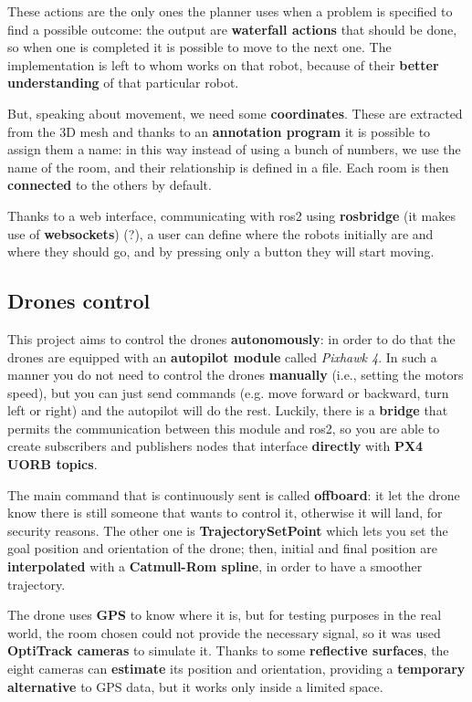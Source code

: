 \bigskip

These actions are the only ones the planner uses when a problem is specified to find a possible outcome: the output are \textbf{waterfall actions} that should be done, so when one is completed it is possible to move to the next one. The implementation is left to whom works on that robot, because of their \textbf{better understanding} of that particular robot.

But, speaking about movement, we need some \textbf{coordinates}. These are extracted from the 3D mesh and thanks to an \textbf{annotation program} it is possible to assign them a name: in this way instead of using a bunch of numbers, we use the name of the room, and their relationship is defined in a file. Each room is then \textbf{connected} to the others by default.

Thanks to a web interface, communicating with \acrshort{ros}2 using \textbf{rosbridge} (it makes use of \textbf{websockets}) (?), a user can define where the robots initially are and where they should go, and by pressing only a button they will start moving.   

\subsection{Drones control}

This project aims to control the drones \textbf{autonomously}: in order to do that the drones are equipped with an \textbf{autopilot module} called \textit{Pixhawk 4}. In such a manner you do not need to control the drones \textbf{manually} (i.e., setting the motors speed), but you can just send commands (e.g. move forward or backward, turn left or right) and the autopilot will do the rest. Luckily, there is a \textbf{bridge} that permits the communication between this module and \acrshort{ros}2, so you are able to create subscribers and publishers nodes that interface \textbf{directly} with \textbf{PX4 UORB topics}\cite{px4}.

The main command that is continuously sent is called \textbf{offboard}: it let the drone know there is still someone that wants to control it, otherwise it will land, for security reasons. The other one is \textbf{TrajectorySetPoint} which lets you set the goal position and orientation of the drone; then, initial and final position are \textbf{interpolated} with a \textbf{Catmull-Rom spline}, in order to have a smoother trajectory.

The drone uses \textbf{GPS} to know where it is, but for testing purposes in the real world, the room chosen could not provide the necessary signal, so it was used \textbf{OptiTrack cameras} to simulate it. Thanks to some \textbf{reflective surfaces}, the eight cameras can \textbf{estimate} its position and orientation, providing a \textbf{temporary alternative} to GPS data, but it works only inside a limited space.

